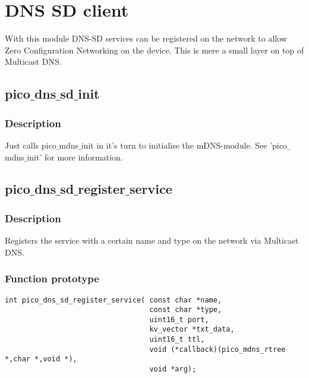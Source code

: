 \section{DNS SD client}

With this module DNS-SD services can be registered on the network to allow Zero Configuration Networking on the device. This is mere a small layer on top of Multicast DNS.

\subsection{pico$\_$dns$\_$sd$\_$init}

\subsubsection*{Description}
Just calls pico$\_$mdns$\_$init in it's turn to initialise the mDNS-module. See 'pico$\_$mdns$\_$init' for more information.


\subsection{pico$\_$dns$\_$sd$\_$register$\_$service}

\subsubsection*{Description}
Registers the service with a certain name and type on the network via Multicast DNS.
\subsubsection*{Function prototype}
\begin{verbatim}
int pico_dns_sd_register_service( const char *name,
                                  const char *type,
                                  uint16_t port,
                                  kv_vector *txt_data,
                                  uint16_t ttl,
                                  void (*callback)(pico_mdns_rtree *,char *,void *),
                                  void *arg);
\end{verbatim}

